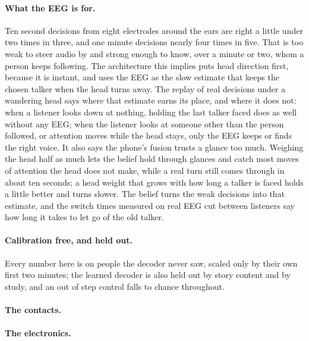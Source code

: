 \paragraph{What the EEG is for.} Ten second decisions from eight electrodes around the ears are right a little under two times in three, and one minute decisions nearly four times in five. That is too weak to steer audio by and strong enough to know, over a minute or two, whom a person keeps following. The architecture this implies puts head direction first, because it is instant, and uses the EEG as the slow estimate that keeps the chosen talker when the head turns away. The replay of real decisions under a wandering head says where that estimate earns its place, and where it does not: when a listener looks down at nothing, holding the last talker faced does as well without any EEG; when the listener looks at someone other than the person followed, or attention moves while the head stays, only the EEG keeps or finds the right voice. It also says the phone's fusion trusts a glance too much. Weighing the head half as much lets the belief hold through glances and catch most moves of attention the head does not make, while a real turn still comes through in about ten seconds; a head weight that grows with how long a talker is faced holds a little better and turns slower. The belief turns the weak decisions into that estimate, and the switch times measured on real EEG cut between listeners say how long it takes to let go of the old talker.

\paragraph{Calibration free, and held out.} Every number here is on people the decoder never saw, scaled only by their own first two minutes; the learned decoder is also held out by story content and by study, and an out of step control falls to chance throughout. 

\paragraph{The contacts.} 

\paragraph{The electronics.} 

